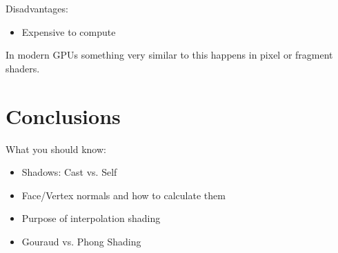 \documentclass{article}
\begin{document}
Disadvantages:
\begin{itemize}
	\item Expensive to compute
\end{itemize}

In modern GPUs something very similar to this happens in pixel or fragment shaders.

\section{Conclusions}
What you should know:
\begin{itemize}
	\item Shadows: Cast vs. Self
	\item Face/Vertex normals and how to calculate them
	\item Purpose of interpolation shading
	\item Gouraud vs. Phong Shading
\end{itemize}
\end{document}
